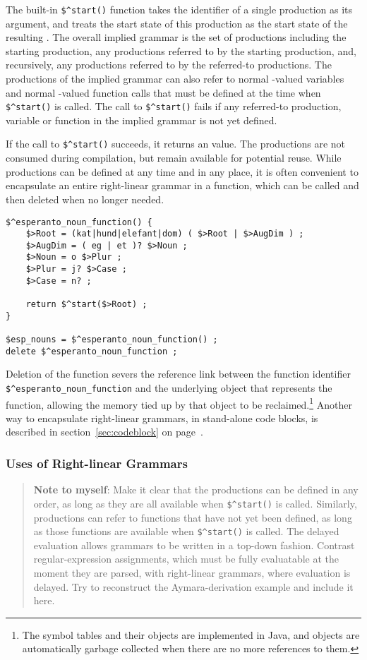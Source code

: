 The built-in \verb!$^start()! function takes the identifier of a single
production as its argument, and treats the start state of this production as the
start state of the resulting \fsm{}.  The overall implied grammar is the set
of productions including the
starting production, any productions referred to by the starting
production, and, 
recursively, any productions referred to by the referred-to productions.
The productions of the implied grammar
can also refer to normal \fsm{}-valued variables and
normal \fsm{}-valued function calls that must be defined at the time when
\verb!$^start()! is called.
The call to \verb!$^start()! fails if any referred-to production, variable
or function in the
implied grammar is
not yet defined.

If the call to \verb!$^start()! succeeds, it returns an \fsm{} value.  The
productions are not consumed during compilation, but remain available for
potential reuse.  While productions can be defined at any time and in any
place, it is often convenient to encapsulate an entire right-linear grammar
in a function, which can be called and then deleted when no longer
needed.

\begin{Verbatim}
$^esperanto_noun_function() {
	$>Root = (kat|hund|elefant|dom) ( $>Root | $>AugDim ) ;
	$>AugDim = ( eg | et )? $>Noun ;
	$>Noun = o $>Plur ;
	$>Plur = j? $>Case ;
	$>Case = n? ;

	return $^start($>Root) ;
}

$esp_nouns = $^esperanto_noun_function() ;
delete $^esperanto_noun_function ;
\end{Verbatim}

Deletion of the function severs the reference link between the function
identifier \verb!$^esperanto_noun_function! and the underlying object that
represents the function, allowing the memory tied up by that object to be
reclaimed.\footnote{The symbol tables and their objects are implemented in
Java, and objects are automatically garbage collected when there are no
more references to them.}  Another way to encapsulate right-linear
grammars, in stand-alone code blocks, is described in
section~\ref{sec:codeblock} on page~\pageref{sec:codeblock}.

\subsubsection{Uses of Right-linear Grammars}

\begin{quote}
\textbf{Note to myself}:   Make it clear that the productions can be defined in any order, as long as they
are all available when \verb!$^start()! is called. Similarly,
productions can refer to functions that have not yet been defined,
as long as those functions are available when \verb!$^start()! is
called.  The delayed evaluation allows grammars to be written in a top-down fashion.  Contrast
regular-expression assignments, which must be fully evaluatable at the
moment they are parsed, with right-linear grammars, where
evaluation is delayed.
Try to reconstruct the Aymara-derivation example and include it here.  
\end{quote}



